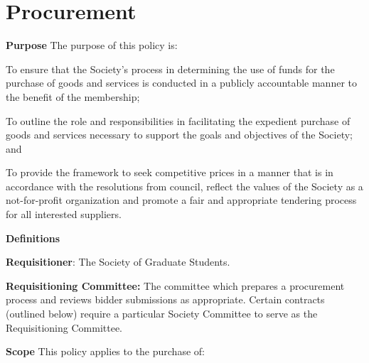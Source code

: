 \section{Procurement}
\begin{longenum}[label*=\thesection.\arabic*., align=left]
\item \textbf{Purpose} \newline
The purpose of this policy is:
\begin{longenum}[label*=\arabic*., align=left]
		 
\item To ensure that the Society's process in determining the use of funds for the purchase of goods and services is conducted in a publicly accountable manner to the benefit of the membership;

\item To outline the role and responsibilities in facilitating the expedient purchase of goods and services necessary to support the goals and objectives of the Society; and

\item To provide the framework to seek competitive prices in a manner that is in accordance with the resolutions from council, reflect the values of the Society as a not-for-profit organization and promote a fair and appropriate tendering process for all interested suppliers.


\end{longenum}

\item \textbf{Definitions}

\begin{longenum} [label*=\arabic*., align=left]
	
\item \textbf{Requisitioner}: The Society of Graduate Students.

\item \textbf{Requisitioning Committee:} The committee which prepares a procurement process and reviews bidder submissions as appropriate. Certain contracts (outlined below) require a particular Society Committee to serve as the Requisitioning Committee.
\end{longenum}

\item \textbf{Scope} \newline
This policy applies to the purchase of:
\begin{longenum} [label*=\arabic*., align=left]


\end{longenum}
\end{longenum}
